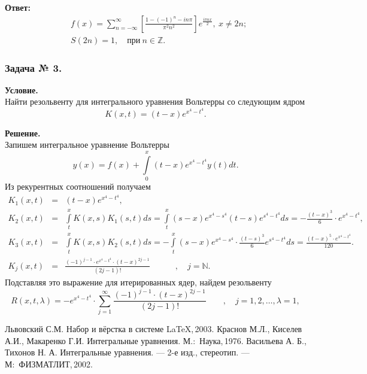 \documentclass[12pt,a4paper]{article}
\begin{document}
			\noindent
			\textbf{Ответ:}
			\[
			\begin{split}
				&f(x)=\sum_{n=-\infty}^\infty\left[ \frac{1-(-1)^n -in\pi}{\pi^2 n^2}\right] e^{\tfrac{i\pi nx}{2}},~ x\ne 2n; \\
				&S(2n)=1,\quad\text{при}~n\in\mathbb{Z}.
			\end{split}
			\]
			
			\subsubsection*{\center Задача № 3.}
			{\bf Условие.~}\\
			Найти резольвенту для интегрального уравнения Вольтерры со следующим ядром 
			$$K(x,t)=(t-x)e^{x^4-t^4}.$$
			
			\noindent
			{\bf Решение.~}\\
			\noindent
			Запишем интегральное уравнение Вольтерры
			$$
			y(x)= f(x) +\int\limits_0^x (t-x)e^{x^4-t^4} y(t)dt.
			$$
			Из рекурентных соотношений получаем
			$$
			\begin{array}{rcl}
				K_1(x,t)&=&\displaystyle (t-x)e^{x^4-t^4}, \\[12pt]
				K_2(x,t)&=&\displaystyle\int\limits_t^x K(x,s)K_1(s,t)ds = \int\limits_t^x (s-x)e^{x^4-s^4} (t-s)e^{s^4-t^4} ds = 
				\displaystyle-\frac{(t-x)^3}{6}\cdot e^{x^4-t^4},\\[12pt]
				K_3(x,t)&=&\displaystyle\int\limits_t^x K(x,s)K_2(s,t)ds = -\int\limits_t^x (s-x)e^{x^4-s^4} \cdot \frac{(t-s)^3}{6} e^{s^4-t^4} ds = \frac{(t-x)^5\cdot e^{x^4-t^4}}{120}.\\[12pt]
				K_j(x,t)&=&\displaystyle\frac{(-1)^{j-1}\cdot e^{x^4-t^4}\cdot (t-x)^{2j-1}}{(2j-1)!}\!\!\!\!\!\!\!\!\!\!\!\!\! \quad \quad \quad, \quad j=\mathbb{N}.
			\end{array}
			$$
			Подставляя это выражение для итерированных ядер, найдем резольвенту
			$$ 
			R(x,t,\lambda)=-e^{x^4-t^4}\cdot \sum_{j=1}^\infty \frac{(-1)^{j-1}\cdot(t-x)^{2j-1}}{(2j-1)!}\!\!\!\!\!\!\!\!\!\!
			\quad\quad,\quad j=1,2,\ldots, \lambda = 1, 
			$$
			
			
			\newpage
			\begin{thebibliography}{99}
				 Львовский С.М. Набор и вёрстка в системе \LaTeX,\,2003.
				 Краснов М.Л., Киселев А.И., Макаренко Г.И. Интегральные уравнения. М.:~Наука,\,1976.
				 Васильева А. Б., Тихонов Н. А. Интегральные уравнения. --- 2-е изд., стереотип. --- М:~ФИЗМАТЛИТ,\,2002.
			\end{thebibliography}
			
		
\end{document}
